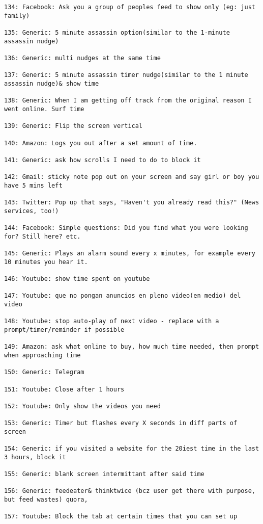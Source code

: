 \begin{lstlisting}[breaklines]
134: Facebook: Ask you a group of peoples feed to show only (eg: just family)

135: Generic: 5 minute assassin option(similar to the 1-minute assassin nudge)

136: Generic: multi nudges at the same time

137: Generic: 5 minute assassin timer nudge(similar to the 1 minute assassin nudge)& show time

138: Generic: When I am getting off track from the original reason I went online. Surf time

139: Generic: Flip the screen vertical

140: Amazon: Logs you out after a set amount of time.

141: Generic: ask how scrolls I need to do to block it

142: Gmail: sticky note pop out on your screen and say girl or boy you have 5 mins left

143: Twitter: Pop up that says, "Haven't you already read this?" (News services, too!)

144: Facebook: Simple questions: Did you find what you were looking for? Still here? etc.

145: Generic: Plays an alarm sound every x minutes, for example every 10 minutes you hear it.

146: Youtube: show time spent on youtube

147: Youtube: que no pongan anuncios en pleno video(en medio) del video

148: Youtube: stop auto-play of next video - replace with a prompt/timer/reminder if possible

149: Amazon: ask what online to buy, how much time needed, then prompt when approaching time

150: Generic: Telegram

151: Youtube: Close after 1 hours

152: Youtube: Only show the videos you need

153: Generic: Timer but flashes every X seconds in diff parts of screen

154: Generic: if you visited a website for the 20iest time in the last 3 hours, block it

155: Generic: blank screen intermittant after said time

156: Generic: feedeater& thinktwice (bcz user get there with purpose, but feed wastes) quora,

157: Youtube: Block the tab at certain times that you can set up


\end{lstlisting}
